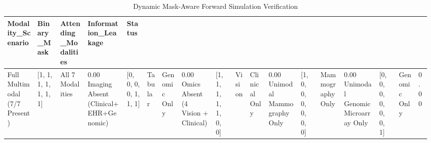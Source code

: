 \begin{table}
\caption{Dynamic Mask-Aware Forward Simulation Verification}
\begin{tabular}{lllll}
\toprule
Modality_Scenario & Binary_Mask & Attending_Modalities & Information_Leakage & Status \\
\midrule
Full Multimodal (7/7 Present) & [1, 1, 1, 1, 1, 1, 1] & All 7 Modalities & 0.00%
Imaging Absent (Clinical+EHR+Genomic) & [0, 0, 0, 0, 1, 1, 1] & Tabular & Genomic Only & 0.00%
Omics Absent (4 Vision + Clinical) & [1, 1, 1, 1, 1, 0, 0] & Vision & Clinical Only & 0.00%
Unimodal Mammography Only & [1, 0, 0, 0, 0, 0, 0] & Mammography Only & 0.00%
Unimodal Genomic Microarray Only & [0, 0, 0, 0, 0, 0, 1] & Genomic Only & 0.00%
\bottomrule
\end{tabular}
\end{table}
